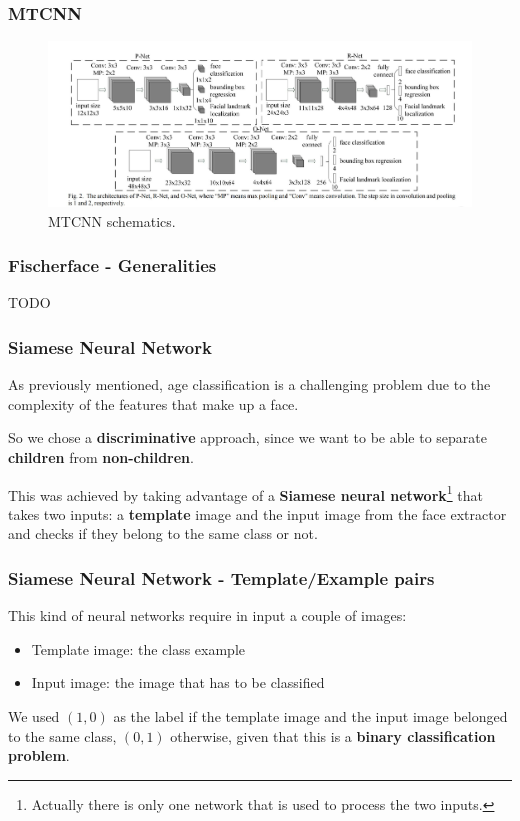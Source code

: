 \documentclass{beamer}
\begin{document}
	\begin{frame}
		\frametitle{MTCNN}
		\begin{figure}
			\centering
			\includegraphics[width=\textwidth]{img/schema_mtcnn.JPG}
    		\caption{MTCNN schematics.}
    		\label{fig:schema_mtcnn}
		\end{figure}
	\end{frame}
	
	\begin{frame}
		\frametitle{Fischerface - Generalities}
		TODO
	\end{frame}
	
	\begin{frame}
		\frametitle{Siamese Neural Network}
		As previously mentioned, age classification is a challenging problem due to the complexity of the features that make up a face.
		
		\bigskip
		
		
		So we chose a \textbf{discriminative} approach, since we want to be able to separate \textbf{children} from \textbf{non-children}.
		
		\bigskip
		
		
		This was achieved by taking advantage of a \textbf{Siamese neural network}\footnote{Actually there is only one network that is used to process the two inputs.} that takes two inputs: a \textbf{template} image and the input image from the face extractor and checks if they belong to the same class or not. 	
	\end{frame}
	
	\begin{frame}
		\frametitle{Siamese Neural Network - Template/Example pairs}
		This kind of neural networks require in input a couple of images:
		\begin{itemize}
			\item Template image: the class example
			\item Input image: the image that has to be classified
		\end{itemize}		
		We used $(1,0)$ as the label if the template image and the input image belonged to the same class, $(0,1)$ otherwise, given that this is a \textbf{binary classification problem}.
	\end{frame}
	
\end{document}
